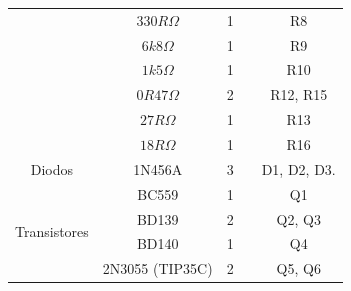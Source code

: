 \documentclass[a4paper,12pt,oneside,openany,table,xcdraw]{article}
\begin{document}
\begin{table}[H]
{\begin{tabular}{|c|c|c|c|c|}
                              & $330R \Omega$          & 1                   &                & R8                 \\ \cline{2-5} 
                              & $6k8 \Omega$           & 1                   &                & R9                 \\ \cline{2-5} 
                              & $1k5 \Omega$           & 1                   &                & R10                \\ \cline{2-5} 
                              & $0R47 \Omega$          & 2                   &                & R12, R15           \\ \cline{2-5} 
                              & $27R \Omega$           & 1                   &                & R13                \\ \cline{2-5} 
                              & $18R \Omega$           & 1                   &                & R16                \\ \hline
Diodos                        & 1N456A                 & 3                   &                & D1, D2, D3.        \\ \hline
\multirow{4}{*}{Transistores} & BC559                  & 1                   &                & Q1                 \\ \cline{2-5} 
                              & BD139                  & 2                   &                & Q2, Q3             \\ \cline{2-5} 
                              & BD140                  & 1                   &                & Q4                 \\ \cline{2-5} 
                              & 2N3055 (TIP35C)        & 2                   &                & Q5, Q6             \\ \hline
\end{tabular}%
}
\end{table}
\end{document}
